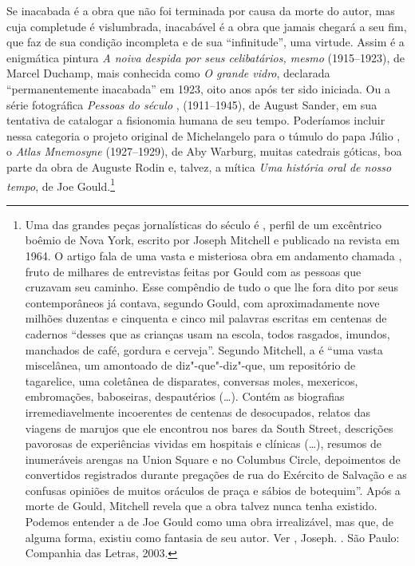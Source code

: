 Se inacabada é a obra que não foi terminada por causa da morte do autor,
mas cuja completude é vislumbrada, inacabável é a obra que jamais
chegará a seu fim, que faz de sua condição incompleta e de sua
``infinitude'', uma virtude. Assim é a enigmática pintura \emph{A noiva
despida por seus celibatários, mesmo} (1915--1923), de Marcel
Duchamp, mais conhecida como \emph{O grande vidro}, declarada
``permanentemente inacabada'' em 1923, oito anos após ter sido iniciada.
Ou a série fotográfica \emph{Pessoas do século} , (1911--1945), de
August Sander, em sua tentativa de catalogar a fisionomia humana de seu
tempo. Poderíamos incluir nessa categoria o projeto original de
Michelangelo para o túmulo do papa Júlio , o \emph{Atlas Mnemosyne}
(1927--1929), de Aby Warburg, muitas catedrais góticas, boa parte da obra
de Auguste Rodin e, talvez, a mítica \emph{Uma história oral de nosso
tempo}, de Joe Gould.\footnote{Uma das grandes peças jornalísticas do
  século  é {}, perfil de um excêntrico
  boêmio de Nova York, escrito por Joseph Mitchell e publicado na
  revista {} em 1964. O artigo fala de uma vasta e
  misteriosa obra em andamento chamada {}, fruto de milhares de entrevistas feitas por Gould com as
  pessoas que cruzavam seu caminho. Esse compêndio de tudo o que lhe
  fora dito por seus contemporâneos já contava, segundo Gould, com
  aproximadamente nove milhões duzentas e cinquenta e cinco mil palavras
  escritas em centenas de cadernos ``desses que as crianças usam na
  escola, todos rasgados, imundos, manchados de café, gordura e
  cerveja''. Segundo Mitchell, a {} é ``uma vasta
  miscelânea, um amontoado de diz"-que"-diz"-que, um repositório de
  tagarelice, uma coletânea de disparates, conversas moles, mexericos,
  embromações, baboseiras, despautérios (\ldots{}). Contém as biografias
  irremediavelmente incoerentes de centenas de desocupados, relatos das
  viagens de marujos que ele encontrou nos bares da South Street,
  descrições pavorosas de experiências vividas em hospitais e clínicas
  (\ldots{}), resumos de inumeráveis arengas na Union Square e no
  Columbus Circle, depoimentos de convertidos registrados durante
  pregações de rua do Exército de Salvação e as confusas opiniões de
  muitos oráculos de praça e sábios de botequim''. Após a morte de
  Gould, Mitchell revela que a obra talvez nunca tenha existido. Podemos
  entender a {} de Joe Gould como uma obra
  irrealizável, mas que, de alguma forma, existiu como fantasia de seu
  autor. Ver , Joseph. {}. São
  Paulo: Companhia das Letras, 2003.}


